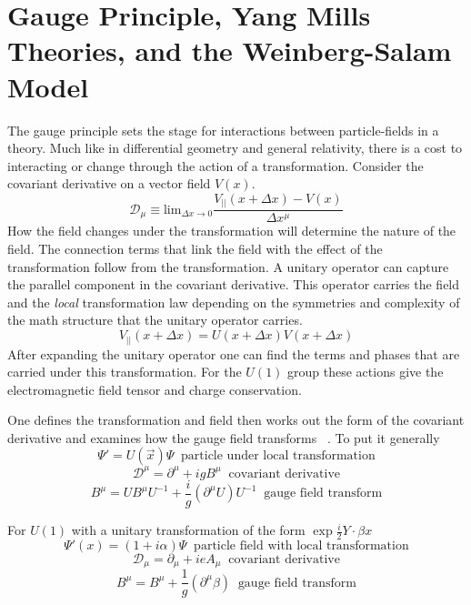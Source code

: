 \section{Gauge Principle, Yang Mills Theories, and the Weinberg-Salam Model}
The gauge principle sets the stage for interactions between particle-fields in a theory. Much like in differential geometry and general relativity, there is a cost to interacting or change through the action of a transformation. Consider the covariant derivative on a vector field $V(x)$.
\[\mathcal{D}_\mu \equiv \text{lim}_{\Delta x \rightarrow 0 } \frac{V_{||}(x+\Delta x) - V(x)}{\Delta x^{\mu}} \] 
How the field changes under the transformation will determine the nature of the field. The connection terms that link the field with the effect of the transformation follow from the transformation. A unitary operator can capture the parallel component in the covariant derivative. This operator carries the field and the \textit{local} transformation law depending on the symmetries and complexity of the math structure that the unitary operator carries. 
\[V_{||}(x+\Delta x) = U(x+\Delta x)V(x+\Delta x)\]
After expanding the unitary operator one can find the terms and phases that are carried under this transformation. 
For the $U(1)$ group these actions give the electromagnetic field tensor and charge conservation. 

One defines the transformation and field then works out the form of the covariant derivative and examines how the gauge field transforms ~\cite{Tully:1417476}. To put it generally
\begin{equation}
\label{eq:lt}
\Psi'= U(\overrightarrow{x})\Psi \;\;\text{particle under local transformation}\end{equation}
\begin{equation}
\label{eq:cd}
\mathcal{D}^\mu = \partial^\mu + igB^\mu \;\;\text{covariant derivative}
\end{equation}
\begin{equation}
\label{eq:gt}
B^\mu = UB^\mu U^{-1} + \frac{i}{g}(\partial^\mu U)U^{-1} \;\;\text{gauge field transform} 
\end{equation} 

For $U(1)$ with a unitary transformation of the form $\exp{\frac{i}{2}Y\cdot\beta{x}}$ 
\[\Psi'(x)= (1+i\alpha)\Psi \;\;\text{particle field with local transformation}\]
\[\mathcal{D}_\mu = \partial_\mu + ieA_\mu \;\;\text{covariant derivative}\]
\[B^\mu = B^\mu + \frac{1}{g}(\partial^\mu \beta) \;\;\text{gauge field transform} \] 


